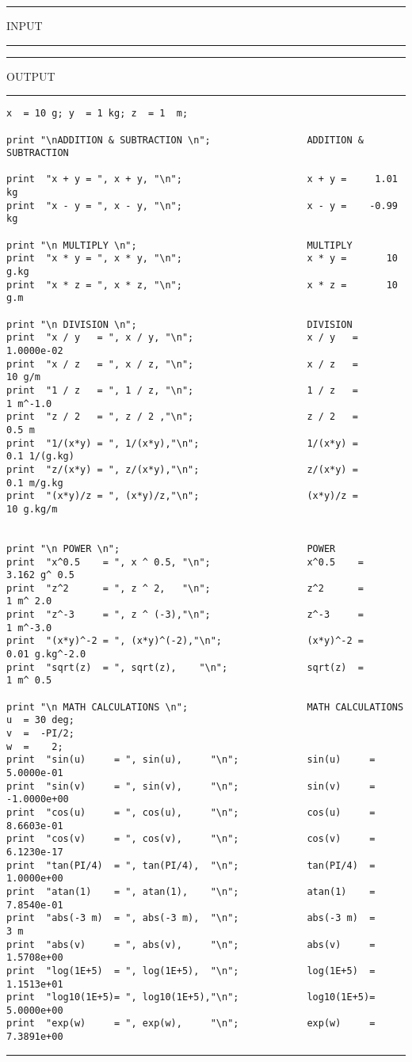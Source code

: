 \vspace{0.15 in}
\begin{footnotesize}
\noindent
\rule{1.2 in}{0.035 in} INPUT \rule{1.2 in}{0.035 in}\hspace{0.1 in}
\rule{1.3 in}{0.035 in} OUTPUT\rule{1.3 in}{0.035 in}
\begin{verbatim}
x  = 10 g; y  = 1 kg; z  = 1  m;

print "\nADDITION & SUBTRACTION \n";                 ADDITION & SUBTRACTION

print  "x + y = ", x + y, "\n";                      x + y =     1.01 kg
print  "x - y = ", x - y, "\n";                      x - y =    -0.99 kg

print "\n MULTIPLY \n";                              MULTIPLY 
print  "x * y = ", x * y, "\n";                      x * y =       10 g.kg
print  "x * z = ", x * z, "\n";                      x * z =       10 g.m

print "\n DIVISION \n";                              DIVISION
print  "x / y   = ", x / y, "\n";                    x / y   =     1.0000e-02
print  "x / z   = ", x / z, "\n";                    x / z   =       10 g/m
print  "1 / z   = ", 1 / z, "\n";                    1 / z   =        1 m^-1.0
print  "z / 2   = ", z / 2 ,"\n";                    z / 2   =      0.5 m
print  "1/(x*y) = ", 1/(x*y),"\n";                   1/(x*y) =      0.1 1/(g.kg)
print  "z/(x*y) = ", z/(x*y),"\n";                   z/(x*y) =      0.1 m/g.kg
print  "(x*y)/z = ", (x*y)/z,"\n";                   (x*y)/z =       10 g.kg/m


print "\n POWER \n";                                 POWER 
print  "x^0.5    = ", x ^ 0.5, "\n";                 x^0.5    =    3.162 g^ 0.5
print  "z^2      = ", z ^ 2,   "\n";                 z^2      =        1 m^ 2.0
print  "z^-3     = ", z ^ (-3),"\n";                 z^-3     =        1 m^-3.0
print  "(x*y)^-2 = ", (x*y)^(-2),"\n";               (x*y)^-2 =     0.01 g.kg^-2.0
print  "sqrt(z)  = ", sqrt(z),    "\n";              sqrt(z)  =        1 m^ 0.5

print "\n MATH CALCULATIONS \n";                     MATH CALCULATIONS 
u  = 30 deg;
v  =  -PI/2;
w  =    2;
print  "sin(u)     = ", sin(u),     "\n";            sin(u)     =     5.0000e-01 
print  "sin(v)     = ", sin(v),     "\n";            sin(v)     =    -1.0000e+00 
print  "cos(u)     = ", cos(u),     "\n";            cos(u)     =     8.6603e-01 
print  "cos(v)     = ", cos(v),     "\n";            cos(v)     =     6.1230e-17 
print  "tan(PI/4)  = ", tan(PI/4),  "\n";            tan(PI/4)  =     1.0000e+00 
print  "atan(1)    = ", atan(1),    "\n";            atan(1)    =     7.8540e-01 
print  "abs(-3 m)  = ", abs(-3 m),  "\n";            abs(-3 m)  =        3 m     
print  "abs(v)     = ", abs(v),     "\n";            abs(v)     =     1.5708e+00 
print  "log(1E+5)  = ", log(1E+5),  "\n";            log(1E+5)  =     1.1513e+01 
print  "log10(1E+5)= ", log10(1E+5),"\n";            log10(1E+5)=     5.0000e+00 
print  "exp(w)     = ", exp(w),     "\n";            exp(w)     =     7.3891e+00 
\end{verbatim}
\rule{6.25 in}{0.035 in}
\end{footnotesize}

